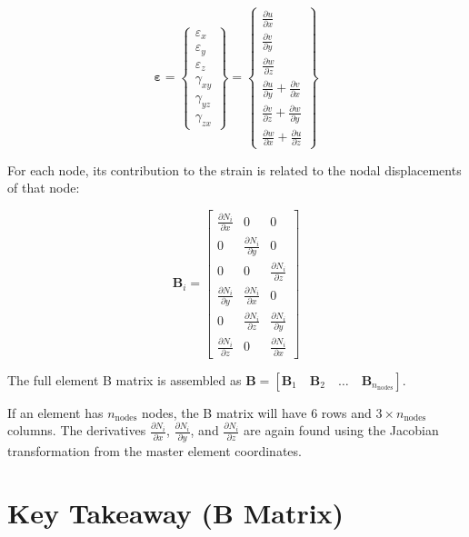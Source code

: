 \documentclass[
  11pt,
  a4paper,
]{scrbook}
\begin{document}
\[\boldsymbol{\varepsilon} = \begin{Bmatrix} \varepsilon_x \\ \varepsilon_y \\ \varepsilon_z \\ \gamma_{xy} \\ \gamma_{yz} \\ \gamma_{zx} \end{Bmatrix} = \begin{Bmatrix}
\frac{\partial u}{\partial x} \\
\frac{\partial v}{\partial y} \\
\frac{\partial w}{\partial z} \\
\frac{\partial u}{\partial y} + \frac{\partial v}{\partial x} \\
\frac{\partial v}{\partial z} + \frac{\partial w}{\partial y} \\
\frac{\partial w}{\partial x} + \frac{\partial u}{\partial z}
\end{Bmatrix}\]

For each node, its contribution to the strain is related to the nodal
displacements of that node:

\[\mathbf{B}_i = \begin{bmatrix}
\frac{\partial N_i}{\partial x} & 0 & 0 \\
0 & \frac{\partial N_i}{\partial y} & 0 \\
0 & 0 & \frac{\partial N_i}{\partial z} \\
\frac{\partial N_i}{\partial y} & \frac{\partial N_i}{\partial x} & 0 \\
0 & \frac{\partial N_i}{\partial z} & \frac{\partial N_i}{\partial y} \\
\frac{\partial N_i}{\partial z} & 0 & \frac{\partial N_i}{\partial x}
\end{bmatrix}\]

The full element B matrix is assembled as
\(\mathbf{B} = [\mathbf{B}_1 \quad \mathbf{B}_2 \quad \ldots \quad \mathbf{B}_{n_{\text{nodes}}}]\).

If an element has \(n_{\text{nodes}}\) nodes, the B matrix will have 6
rows and \(3 \times n_{\text{nodes}}\) columns. The derivatives
\(\frac{\partial N_i}{\partial x}\),
\(\frac{\partial N_i}{\partial y}\), and
\(\frac{\partial N_i}{\partial z}\) are again found using the Jacobian
transformation from the master element coordinates.

\section{Key Takeaway (B Matrix)}\label{key-takeaway-b-matrix}
\end{document}
